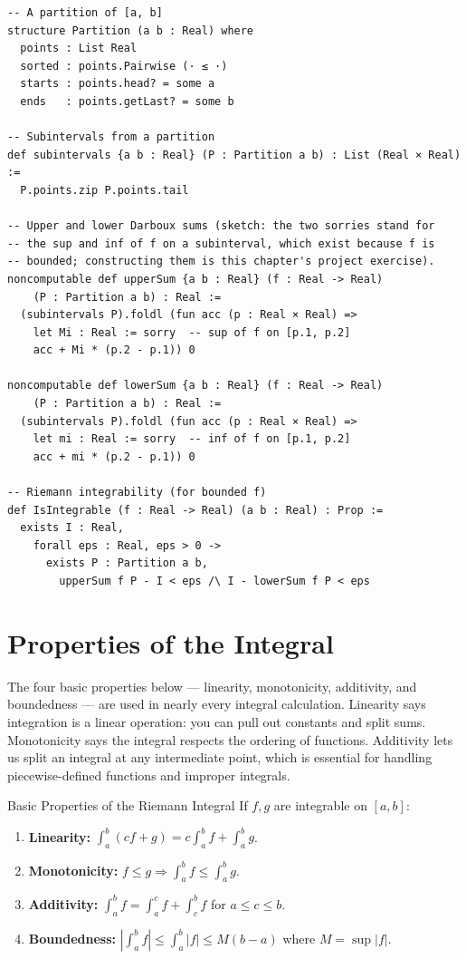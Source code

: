 \documentclass[12pt, openany]{book}
\theoremstyle{plain}
\theoremstyle{definition}
\theoremstyle{remark}
\begin{document}
\begin{leanbox}
\begin{lstlisting}
-- A partition of [a, b]
structure Partition (a b : Real) where
  points : List Real
  sorted : points.Pairwise (· ≤ ·)
  starts : points.head? = some a
  ends   : points.getLast? = some b

-- Subintervals from a partition
def subintervals {a b : Real} (P : Partition a b) : List (Real × Real) :=
  P.points.zip P.points.tail

-- Upper and lower Darboux sums (sketch: the two sorries stand for
-- the sup and inf of f on a subinterval, which exist because f is
-- bounded; constructing them is this chapter's project exercise).
noncomputable def upperSum {a b : Real} (f : Real -> Real)
    (P : Partition a b) : Real :=
  (subintervals P).foldl (fun acc (p : Real × Real) =>
    let Mi : Real := sorry  -- sup of f on [p.1, p.2]
    acc + Mi * (p.2 - p.1)) 0

noncomputable def lowerSum {a b : Real} (f : Real -> Real)
    (P : Partition a b) : Real :=
  (subintervals P).foldl (fun acc (p : Real × Real) =>
    let mi : Real := sorry  -- inf of f on [p.1, p.2]
    acc + mi * (p.2 - p.1)) 0

-- Riemann integrability (for bounded f)
def IsIntegrable (f : Real -> Real) (a b : Real) : Prop :=
  exists I : Real,
    forall eps : Real, eps > 0 ->
      exists P : Partition a b,
        upperSum f P - I < eps /\ I - lowerSum f P < eps
\end{lstlisting}
\end{leanbox}
\color{black}

\section{Properties of the Integral}

The four basic properties below --- linearity, monotonicity, additivity, and boundedness --- are used in nearly every integral calculation.  Linearity says integration is a linear operation: you can pull out constants and split sums.  Monotonicity says the integral respects the ordering of functions.  Additivity lets us split an integral at any intermediate point, which is essential for handling piecewise-defined functions and improper integrals.

\begin{thmbox}{Basic Properties of the Riemann Integral}
If $f, g$ are integrable on $[a,b]$:
\begin{enumerate}[noitemsep]
  \item \textbf{Linearity:} $\int_a^b (cf + g) = c\int_a^b f + \int_a^b g$.
  \item \textbf{Monotonicity:} $f \leq g \Rightarrow \int_a^b f \leq \int_a^b g$.
  \item \textbf{Additivity:} $\int_a^b f = \int_a^c f + \int_c^b f$ for $a \leq c \leq b$.
  \item \textbf{Boundedness:} $\left|\int_a^b f\right| \leq \int_a^b |f| \leq M(b-a)$ where $M = \sup|f|$.
\end{enumerate}
\end{thmbox}
\color{black}
\end{document}
